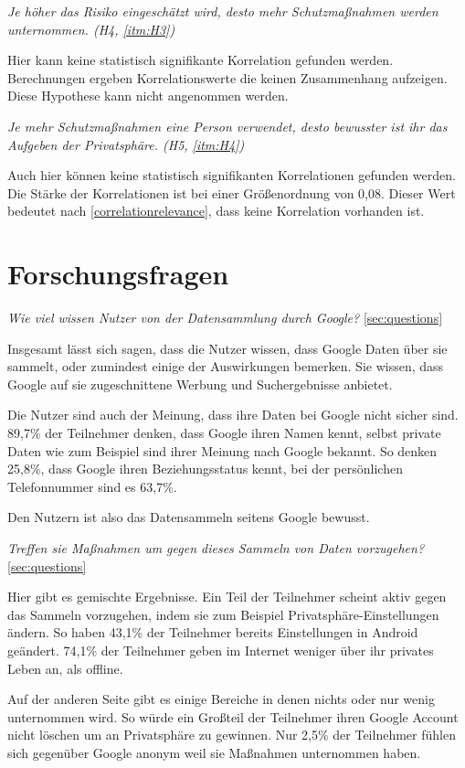 \textit{Je höher das Risiko eingeschätzt wird, desto mehr Schutzmaßnahmen werden unternommen. (H4, \ref{itm:H3})}

Hier kann keine statistisch signifikante Korrelation gefunden werden. Berechnungen ergeben Korrelationswerte die keinen Zusammenhang aufzeigen. Diese Hypothese kann nicht angenommen werden.

\textit{Je mehr Schutzmaßnahmen eine Person verwendet, desto bewusster ist ihr das Aufgeben der Privatsphäre. (H5, \ref{itm:H4})}

Auch hier können keine statistisch signifikanten Korrelationen gefunden werden. Die Stärke der Korrelationen ist bei einer Größenordnung von 0,08. Dieser Wert bedeutet nach \ref{correlationrelevance}, dass keine Korrelation vorhanden ist.

\section{Forschungsfragen}
\label{sec:forschungsfragen}
\textit{Wie viel wissen Nutzer von der Datensammlung durch Google?} \ref{sec:questions}

Insgesamt lässt sich sagen, dass die Nutzer wissen, dass Google Daten über sie sammelt, oder zumindest einige der Auswirkungen bemerken. Sie wissen, dass Google auf sie zugeschnittene Werbung und Suchergebnisse anbietet.

Die Nutzer sind auch der Meinung, dass ihre Daten bei Google nicht sicher sind. 89,7\% der Teilnehmer denken, dass Google ihren Namen kennt, selbst private Daten wie zum Beispiel sind ihrer Meinung nach Google bekannt. So denken 25,8\%, dass Google ihren Beziehungsstatus kennt, bei der persönlichen Telefonnummer sind es 63,7\%.

Den Nutzern ist also das Datensammeln seitens Google bewusst.

\textit{Treffen sie Maßnahmen um gegen dieses Sammeln von Daten vorzugehen?} \ref{sec:questions}

Hier gibt es gemischte Ergebnisse. Ein Teil der Teilnehmer scheint aktiv gegen das Sammeln vorzugehen, indem sie zum Beispiel Privatsphäre-Einstellungen ändern. So haben 43,1\% der Teilnehmer bereits Einstellungen in Android geändert. 74,1\% der Teilnehmer geben im Internet weniger über ihr privates Leben an, als offline.

Auf der anderen Seite gibt es einige Bereiche in denen nichts oder nur wenig unternommen wird. So würde ein Großteil der Teilnehmer ihren Google Account nicht löschen um an Privatsphäre zu gewinnen. Nur 2,5\% der Teilnehmer fühlen sich gegenüber Google anonym weil sie Maßnahmen unternommen haben.

